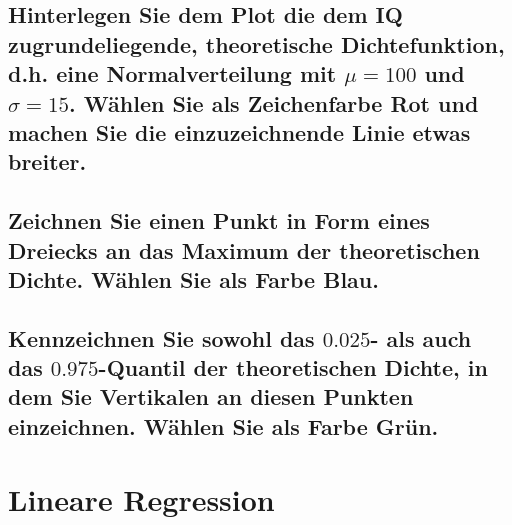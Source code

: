\documentclass[12pt,a4paper]{article}
\begin{document}
\subsection{\texorpdfstring{Hinterlegen Sie dem Plot die dem IQ
zugrundeliegende, theoretische Dichtefunktion, d.h. eine
Normalverteilung mit \(\mu=100\) und \(\sigma=15\). Wählen Sie als
Zeichenfarbe Rot und machen Sie die einzuzeichnende Linie etwas
breiter.}{Hinterlegen Sie dem Plot die dem IQ zugrundeliegende, theoretische Dichtefunktion, d.h. eine Normalverteilung mit \textbackslash mu=100 und \textbackslash sigma=15. Wählen Sie als Zeichenfarbe Rot und machen Sie die einzuzeichnende Linie etwas breiter.}}\label{hinterlegen-sie-dem-plot-die-dem-iq-zugrundeliegende-theoretische-dichtefunktion-d.h.-eine-normalverteilung-mit-mu100-und-sigma15.-wuxe4hlen-sie-als-zeichenfarbe-rot-und-machen-sie-die-einzuzeichnende-linie-etwas-breiter.}

\subsection{Zeichnen Sie einen Punkt in Form eines Dreiecks an das
Maximum der theoretischen Dichte. Wählen Sie als Farbe
Blau.}\label{zeichnen-sie-einen-punkt-in-form-eines-dreiecks-an-das-maximum-der-theoretischen-dichte.-wuxe4hlen-sie-als-farbe-blau.}

\subsection{\texorpdfstring{Kennzeichnen Sie sowohl das \(0.025\)- als
auch das \(0.975\)-Quantil der theoretischen Dichte, in dem Sie
Vertikalen an diesen Punkten einzeichnen. Wählen Sie als Farbe
Grün.}{Kennzeichnen Sie sowohl das 0.025- als auch das 0.975-Quantil der theoretischen Dichte, in dem Sie Vertikalen an diesen Punkten einzeichnen. Wählen Sie als Farbe Grün.}}\label{kennzeichnen-sie-sowohl-das-0.025--als-auch-das-0.975-quantil-der-theoretischen-dichte-in-dem-sie-vertikalen-an-diesen-punkten-einzeichnen.-wuxe4hlen-sie-als-farbe-gruxfcn.}

\section{Lineare Regression}\label{lineare-regression}
\end{document}
